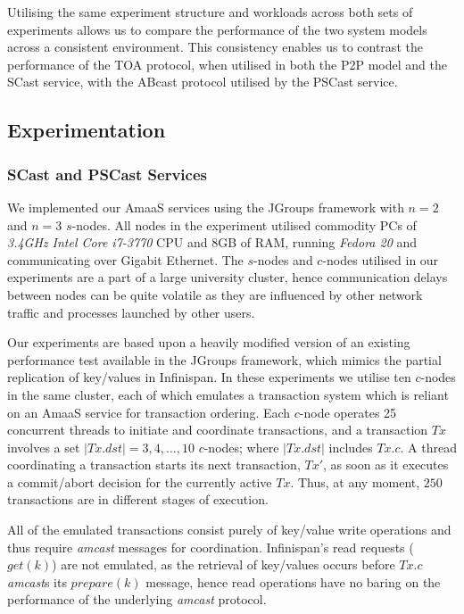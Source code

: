    Utilising the same experiment structure and workloads across both sets of experiments allows us to compare the performance of the two system models across a consistent environment.  This consistency enables us to contrast the performance of the TOA protocol, when utilised in both the P2P model and the \textsf{SCast} service, with the \textsf{ABcast} protocol utilised by the \textsf{PSCast} service.  

	\subsection{Experimentation}\label{ssec:emulated_transaction_experiments}
	\subsubsection*{\textsf{SCast} and \textsf{PSCast} Services}
	We implemented our \textsf{AmaaS} services using the JGroups\citep{JGroups} framework with $n=2$ and $n=3$ $s$-nodes.  All nodes in the experiment utilised commodity PCs of \emph{3.4GHz Intel Core i7-3770} CPU and 8GB of RAM, running \emph{Fedora 20} and communicating over Gigabit Ethernet. The $s$-nodes and $c$-nodes utilised in our experiments are a part of a large university cluster, hence communication delays between nodes can be quite volatile as they are influenced by other network traffic and processes launched by other users.
	
	Our experiments are based upon a heavily modified version of an existing performance test available in the JGroups\citep{JGroups} framework, which mimics the partial replication of key/values in Infinispan\citep{Infinispan}.  In these experiments we utilise ten $c$-nodes in the same cluster, each of which emulates a transaction system which is reliant on an \textsf{AmaaS} service for transaction ordering.  Each $c$-node operates 25 concurrent threads to initiate and coordinate transactions, and a transaction $Tx$ involves a set $|Tx.dst| = 3,4,\ldots,10$ $c$-nodes; where $|Tx.dst|$ includes $Tx.c$. A thread coordinating a transaction starts its next transaction, $Tx'$, as soon as it executes a commit/abort decision for the currently active $Tx$. Thus, at any moment, $250$ transactions are in different stages of execution.  
	
	All of the emulated transactions consist purely of key/value write operations and thus require \emph{amcast} messages for coordination.  Infinispan's read requests ($get(k)$) are not emulated, as the retrieval of key/values occurs before $Tx.c$ \emph{amcast}s its $prepare(k)$ message, hence read operations have no baring on the performance of the underlying \emph{amcast} protocol.  
	
